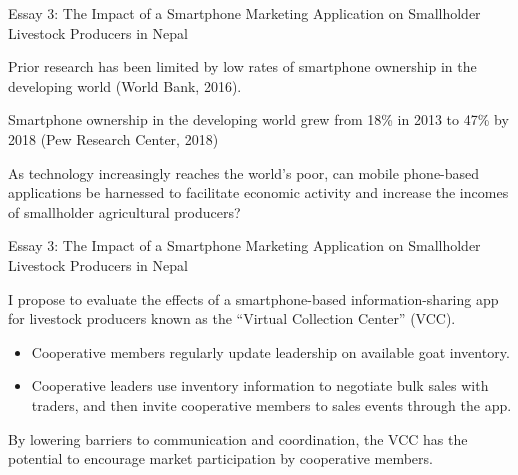 \documentclass[aspectratio=169]{beamer}
\newenvironment{wideitemize}{\itemize\addtolength{\itemsep}{10pt}}{\enditemize}
\begin{document}
\begin{frame}{Essay 3: The Impact of a Smartphone Marketing Application on Smallholder Livestock Producers in Nepal}

    \begin{wideitemize}
        \item Prior research has been limited by low rates of smartphone ownership in the developing world (World Bank, 2016).
        \item Smartphone ownership in the developing world grew from 18\% in 2013 to 47\% by 2018 (Pew Research Center, 2018)
        \item As technology increasingly reaches the world’s poor, can mobile phone-based applications be harnessed to facilitate economic activity and increase the incomes of smallholder agricultural producers?
    \end{wideitemize}
\end{frame}

\begin{frame}{Essay 3: The Impact of a Smartphone Marketing Application on Smallholder Livestock Producers in Nepal}

    \begin{wideitemize}
        \item I propose to evaluate the effects of a smartphone-based information-sharing app for livestock producers known as the “Virtual Collection Center” (VCC). \vspace{.25cm}
        \begin{itemize}
            \item Cooperative members regularly update leadership on available goat inventory. \vspace{.25cm}
            \item Cooperative leaders use inventory information to negotiate bulk sales with traders, and then invite cooperative members to sales events through the app.
        \end{itemize}
        \item By lowering barriers to communication and coordination, the VCC has the potential to encourage market participation by cooperative members. 
    \end{wideitemize}
\end{frame}
\end{document}
